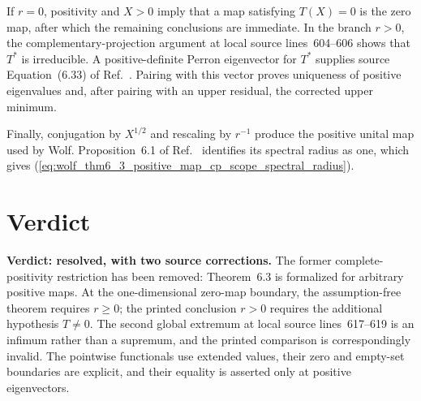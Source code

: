 \documentclass[11pt]{article}
\begin{document}
If $r=0$, positivity and $X>0$ imply that a map satisfying $T(X)=0$ is the
zero map, after which the remaining conclusions are immediate. In the branch
$r>0$, the complementary-projection argument at local source lines~604--606
shows that $T^*$ is irreducible. A positive-definite Perron eigenvector for
$T^*$ supplies source Equation~(6.33) of Ref.~\cite{Wolf2012Quantum}. Pairing with this vector proves
uniqueness of positive eigenvalues and, after pairing with an upper residual,
the corrected upper minimum.

Finally, conjugation by $X^{1/2}$ and rescaling by $r^{-1}$ produce the
positive unital map used by Wolf. Proposition~6.1 of
Ref.~\cite{Wolf2012Quantum} identifies its spectral radius as one, which gives
(\ref{eq:wolf_thm6_3_positive_map_cp_scope_spectral_radius}).

\section{Verdict}

\textbf{Verdict: resolved, with two source corrections.} The former
complete-positivity restriction has been removed: Theorem~6.3 is formalized
for arbitrary positive maps. At the one-dimensional zero-map boundary, the
assumption-free theorem requires $r\geq0$; the printed conclusion $r>0$
requires the additional hypothesis $T\neq0$. The second global extremum at
local source lines~617--619 is an infimum rather than a supremum, and the
printed comparison is correspondingly invalid. The pointwise functionals use
extended values, their zero and empty-set boundaries are explicit, and their
equality is asserted only at positive eigenvectors.



\end{document}
